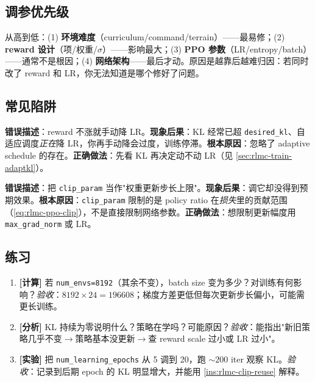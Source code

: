 \subsection{调参优先级}

从高到低：(1) \textbf{环境难度}（curriculum/command/terrain）——最易修；(2) \textbf{reward 设计}（项/权重/$\sigma$）——影响最大；(3) \textbf{PPO 参数}（LR/entropy/batch）——通常不是根因；(4) \textbf{网络架构}——最后才动。原因是越靠后越难归因：若同时改了 reward 和 LR，你无法知道是哪个修好了问题。

\subsection{常见陷阱}

\begin{pitfall}
\textbf{错误描述}：reward 不涨就手动降 LR。\textbf{现象后果}：KL 经常已超 \verb|desired_kl|、自适应调度\emph{正在}降 LR，你再手动降会过度，训练停滞。\textbf{根本原因}：忽略了 adaptive schedule 的存在。\textbf{正确做法}：先看 KL 再决定动不动 LR（见 \cref{sec:rlmc-train-adaptkl}）。
\end{pitfall}

\begin{pitfall}
\textbf{错误描述}：把 \verb|clip_param| 当作"权重更新步长上限"。\textbf{现象后果}：调它却没得到预期效果。\textbf{根本原因}：\verb|clip_param| 限制的是 policy ratio 在\emph{损失}里的贡献范围（\cref{eq:rlmc-ppo-clip}），不是直接限制网络参数。\textbf{正确做法}：想限制更新幅度用 \verb|max_grad_norm| 或 LR。
\end{pitfall}

\subsection{练习}

\begin{practice}[超参诊断]
\begin{enumerate}
  \item \textbf{[计算]} 若 \verb|num_envs=8192|（其余不变），batch size 变为多少？对训练有何影响？\emph{验收}：$8192\times24=196608$；梯度方差更低但每次更新步长偏小，可能需更长训练。
  \item \textbf{[分析]} KL 持续为零说明什么？策略在学吗？可能原因？\emph{验收}：能指出"新旧策略几乎不变$\to$策略基本没更新$\to$查 reward scale 过小或 LR 过小"。
  \item \textbf{[实验]} 把 \verb|num_learning_epochs| 从 5 调到 20，跑 $\sim200$ iter 观察 KL。\emph{验收}：记录到后期 epoch 的 KL 明显增大，并能用 \cref{ins:rlmc-clip-reuse} 解释。
\end{enumerate}
\end{practice}

